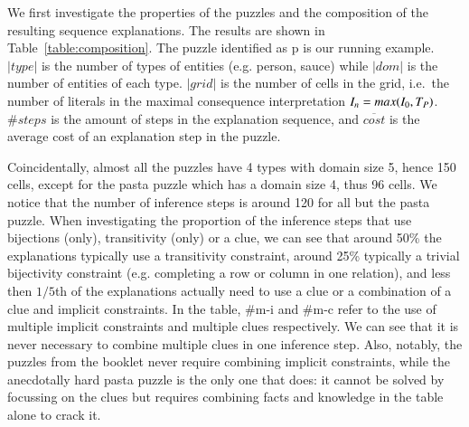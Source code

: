 We first investigate the properties of the puzzles and the composition of the resulting sequence explanations. The results are shown in Table~\ref{table:composition}.
The puzzle identified as p is our running example.
$|type|$ is the number of types of entities (e.g. person, sauce) while $|dom|$ is the number of entities of each type.
$|grid|$ is the number of cells in the grid, i.e.\ the number of literals in the maximal consequence interpretation $I_n=max(I_0,T_P)$. $\# steps$ is the amount of steps in the explanation sequence, and $\overline{cost}$ is the average cost of an explanation step in the puzzle.

Coincidentally, almost all the puzzles have 4 types with domain size 5,  hence 150 cells, except for the pasta puzzle which has a domain size 4, thus 96 cells.
We notice that the number of inference steps is around 120 for all but the pasta puzzle.
When investigating the proportion of the inference steps that use bijections (only), transitivity (only) or a clue, we can see that around 50\% the explanations typically use a transitivity constraint, around 25\% typically a trivial bijectivity constraint (e.g. completing a row or column in one relation), and less then $1/5$th of the explanations actually need to use a clue or a combination of a clue and implicit constraints.
In the table, \#m-i and \#m-c refer to the use of multiple implicit constraints and multiple clues respectively.
We can see that it is never necessary to combine multiple clues in one inference step.
Also, notably, the puzzles from the booklet never require combining implicit constraints, while the anecdotally hard pasta puzzle is the only one that does: it cannot be solved by focussing on the clues but requires combining facts and knowledge in the table alone to crack it.

